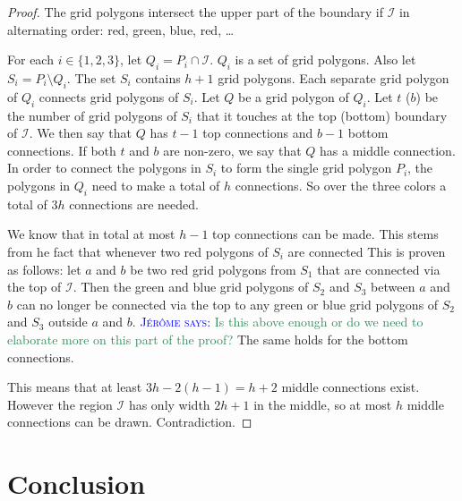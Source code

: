 \documentclass[a4paper,UKenglish,cleveref]{lipics-v2019}
\newcommand{\mremark}[3]{\textcolor{blue}{\textsc{#1 #2:}} \textcolor{SeaGreen}{\textsf{#3}}}
\newcommand{\jerome}[2][says]{\mremark{J\'er\^ome}{#1}{#2}}
\newcommand{\ixi}{\mathcal{I}}
\begin{document}
\begin{proof}
The grid polygons intersect the upper part of the boundary if $\ixi$ in alternating order: red, green, blue, red, \dots

For each $i\in\{1, 2, 3\}$, let $Q_i=P_i\cap \ixi$.
$Q_i$ is a set of grid polygons.
Also let $S_i=P_i\setminus Q_i$.
The set $S_i$ contains $h+1$ grid polygons.
Each separate grid polygon of $Q_i$ connects grid polygons of $S_i$.
Let $Q$ be a grid polygon of $Q_i$. Let $t$ ($b$) be the number of grid polygons of $S_i$ that it touches at the top (bottom) boundary of $\ixi$. We then say that $Q$ has $t-1$ top connections and $b-1$ bottom connections.
If both $t$ and $b$ are non-zero, we say that $Q$ has a middle connection.
In order to connect the polygons in $S_i$ to form the single grid polygon $P_i$, the polygons in $Q_i$ need to make a total of $h$ connections.
So over the three colors a total of $3h$ connections are needed.

We know that in total at most $h-1$ top connections can be made. This stems from he fact that whenever two red polygons of $S_i$ are connected
This is proven as follows:
let $a$ and $b$ be two red grid polygons from $S_1$ that are connected via the top of $\ixi$. Then the green and blue grid polygons of $S_2$ and $S_3$ between $a$ and $b$ can no longer be connected via the top to any green or blue grid polygons of $S_2$ and $S_3$ outside $a$ and $b$.
\jerome{Is this above enough or do we need to elaborate more on this part of the proof?}
The same holds for the bottom connections.

This means that at least $3h- 2(h-1) = h+2$ middle connections exist. However the region $\ixi$ has only width $2h+1$ in the middle, so at most $h$ middle connections can be drawn.
Contradiction.

\end{proof}




\section{Conclusion} %
\label{sec:conclusion}
\end{document}
